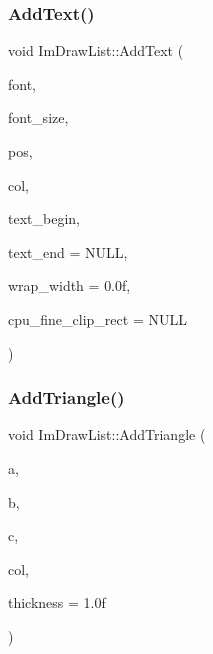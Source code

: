\subsubsection{\texorpdfstring{Add\+Text()}{AddText()}\hspace{0.1cm}{\footnotesize\ttfamily [2/2]}}
{\footnotesize\ttfamily void Im\+Draw\+List\+::\+Add\+Text (\begin{DoxyParamCaption}\item[{const \hyperlink{struct_im_font}{Im\+Font} $\ast$}]{font,  }\item[{float}]{font\+\_\+size,  }\item[{const \hyperlink{struct_im_vec2}{Im\+Vec2} \&}]{pos,  }\item[{Im\+U32}]{col,  }\item[{const char $\ast$}]{text\+\_\+begin,  }\item[{const char $\ast$}]{text\+\_\+end = {\ttfamily NULL},  }\item[{float}]{wrap\+\_\+width = {\ttfamily 0.0f},  }\item[{const \hyperlink{struct_im_vec4}{Im\+Vec4} $\ast$}]{cpu\+\_\+fine\+\_\+clip\+\_\+rect = {\ttfamily NULL} }\end{DoxyParamCaption})}

\hypertarget{struct_im_draw_list_ad04c8e04644b1cf54c7c7b8f352d5e41}{}\label{struct_im_draw_list_ad04c8e04644b1cf54c7c7b8f352d5e41} 
\subsubsection{\texorpdfstring{Add\+Triangle()}{AddTriangle()}}
{\footnotesize\ttfamily void Im\+Draw\+List\+::\+Add\+Triangle (\begin{DoxyParamCaption}\item[{const \hyperlink{struct_im_vec2}{Im\+Vec2} \&}]{a,  }\item[{const \hyperlink{struct_im_vec2}{Im\+Vec2} \&}]{b,  }\item[{const \hyperlink{struct_im_vec2}{Im\+Vec2} \&}]{c,  }\item[{Im\+U32}]{col,  }\item[{float}]{thickness = {\ttfamily 1.0f} }\end{DoxyParamCaption})}

\hypertarget{struct_im_draw_list_a2395370cf2dab19fce3c0e2542cd4f25}{}\label{struct_im_draw_list_a2395370cf2dab19fce3c0e2542cd4f25} 

